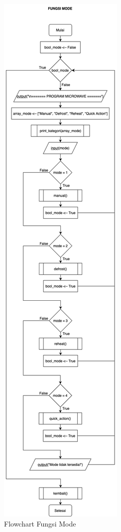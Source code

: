 \documentclass[conference]{IEEEtran}
\begin{document}
\begin{figure}[htbp]
    \centering
    \def\svgwidth{\columnwidth}
    \centerline{\includegraphics[scale=0.36]{Mode.png}}
    \caption{Flowchart Fungsi Mode}
    \label{fig6}
\end{figure}
\end{document}
